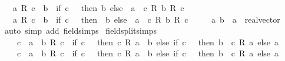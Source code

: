 \begin{isabellebody}
\ \ {\isachardoublequoteopen}{\isacharminus}{\kern0pt}\ {\isacharparenleft}{\kern0pt}a\ {\isacharslash}{\kern0pt}\isactrlsub R\ c{\isacharparenright}{\kern0pt}\ {\isacharplus}{\kern0pt}\ b\ {\isacharequal}{\kern0pt}\ {\isacharparenleft}{\kern0pt}if\ c\ {\isacharequal}{\kern0pt}\ {}\ then\ b\ else\ {\isacharparenleft}{\kern0pt}{\isacharminus}{\kern0pt}\ a\ {\isacharplus}{\kern0pt}\ c\ {\isacharasterisk}{\kern0pt}\isactrlsub R\ b{\isacharparenright}{\kern0pt}\ {\isacharslash}{\kern0pt}\isactrlsub R\ c{\isacharparenright}{\kern0pt}{\isachardoublequoteclose}\isanewline
\ \ {\isachardoublequoteopen}{\isacharminus}{\kern0pt}\ {\isacharparenleft}{\kern0pt}a\ {\isacharslash}{\kern0pt}\isactrlsub R\ c{\isacharparenright}{\kern0pt}\ {\isacharminus}{\kern0pt}\ b\ {\isacharequal}{\kern0pt}\ {\isacharparenleft}{\kern0pt}if\ c\ {\isacharequal}{\kern0pt}\ {}\ then\ {\isacharminus}{\kern0pt}\ b\ else\ {\isacharparenleft}{\kern0pt}{\isacharminus}{\kern0pt}\ a\ {\isacharminus}{\kern0pt}\ c\ {\isacharasterisk}{\kern0pt}\isactrlsub R\ b{\isacharparenright}{\kern0pt}\ {\isacharslash}{\kern0pt}\isactrlsub R\ c{\isacharparenright}{\kern0pt}{\isachardoublequoteclose}\isanewline
\ \ \ \ \ a\ b\ {\isacharcolon}{\kern0pt}{\isacharcolon}{\kern0pt}\ {\isachardoublequoteopen}{\isacharprime}{\kern0pt}a\ {\isacharcolon}{\kern0pt}{\isacharcolon}{\kern0pt}\ real{\isacharunderscore}{\kern0pt}vector{\isachardoublequoteclose}\isanewline
%
\isadelimproof
\ \ %
\endisadelimproof
%
\isatagproof
{}\isamarkupfalse%
\ {\isacharparenleft}{\kern0pt}auto\ simp\ add{\isacharcolon}{\kern0pt}\ field{\isacharunderscore}{\kern0pt}simps{\isacharparenright}{\kern0pt}%
\endisatagproof
{\isafoldproof}%
%
\isadelimproof
\isanewline
%
\endisadelimproof
\isanewline
{}\isamarkupfalse%
\ {\isacharbrackleft}{\kern0pt}field{\isacharunderscore}{\kern0pt}split{\isacharunderscore}{\kern0pt}simps{\isacharbrackright}{\kern0pt}{\isacharcolon}{\kern0pt}\isanewline
\ \ {\isachardoublequoteopen}{}\ {\isacharless}{\kern0pt}\ c\ {\isasymLongrightarrow}\ a\ {\isasymle}\ b\ {\isacharslash}{\kern0pt}\isactrlsub R\ c\ {\isasymlongleftrightarrow}\ {\isacharparenleft}{\kern0pt}if\ c\ {\isachargreater}{\kern0pt}\ {}\ then\ c\ {\isacharasterisk}{\kern0pt}\isactrlsub R\ a\ {\isasymle}\ b\ else\ if\ c\ {\isacharless}{\kern0pt}\ {}\ then\ b\ {\isasymle}\ c\ {\isacharasterisk}{\kern0pt}\isactrlsub R\ a\ else\ a\ {\isasymle}\ {}{\isacharparenright}{\kern0pt}{\isachardoublequoteclose}\isanewline
\ \ {\isachardoublequoteopen}{}\ {\isacharless}{\kern0pt}\ c\ {\isasymLongrightarrow}\ a\ {\isacharless}{\kern0pt}\ b\ {\isacharslash}{\kern0pt}\isactrlsub R\ c\ {\isasymlongleftrightarrow}\ {\isacharparenleft}{\kern0pt}if\ c\ {\isachargreater}{\kern0pt}\ {}\ then\ c\ {\isacharasterisk}{\kern0pt}\isactrlsub R\ a\ {\isacharless}{\kern0pt}\ b\ else\ if\ c\ {\isacharless}{\kern0pt}\ {}\ then\ b\ {\isacharless}{\kern0pt}\ c\ {\isacharasterisk}{\kern0pt}\isactrlsub R\ a\ else\ a\ {\isacharless}{\kern0pt}\ {}{\isacharparenright}{\kern0pt}{\isachardoublequoteclose}\isanewline

\end{isabellebody}
